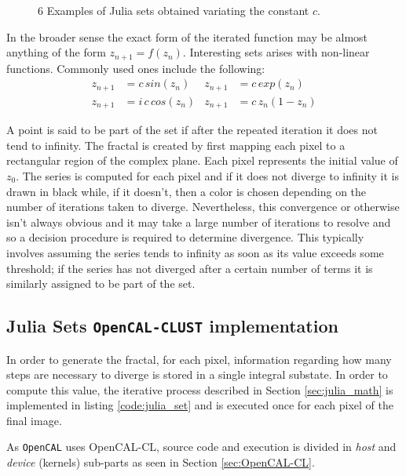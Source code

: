 \begin{figure}[!htb]
    \caption{6 Examples of Julia sets obtained variating the constant $c$.}
        \label{fig:julia_set_c}
\end{figure}

In the broader sense the exact form of the iterated function may be almost anything of the form $z_{n+1} = f(z_n)$. Interesting sets arises with non-linear functions. Commonly used ones include the following:
\begin{align*}
z_{n+1} &= c\, sin(z_n) & z_{n+1} &= c \,exp(z_n)\\
z_{n+1} &= i\,c\, cos(z_n) &z_{n+1} &= c\, z_n(1-z_n)
\end{align*}

A point is said to be part of the set if after the repeated iteration it does not tend to infinity.
The fractal is created by first mapping each pixel to a rectangular region of the complex plane. Each pixel represents the initial value of $z_0$. The series is computed for each pixel and if it does not diverge to infinity it is drawn in black while, if it doesn't, then a color is chosen depending on the number of iterations taken to diverge. Nevertheless, this convergence or otherwise isn't always obvious and it may take a large number of iterations to resolve and so a decision procedure is required to determine divergence. This typically involves assuming the series tends to infinity as soon as its value exceeds some threshold; if the series has not diverged after a certain number of terms it is similarly assigned to be part of the set. 

\subsection{Julia Sets \texttt{OpenCAL-CLUST}  implementation}
In order to generate the fractal, for each pixel, information regarding how many steps are necessary to diverge is stored in a single integral substate.
In order to compute this value, the iterative process described in Section \ref{sec:julia_math} is implemented in listing \ref{code:julia_set} and is executed once for each pixel of the final image.

As \texttt{OpenCAL} uses OpenCAL-CL, source code and execution is divided in \textit{host} and \textit{device} (kernels) sub-parts as seen in Section \ref{sec:OpenCAL-CL}.  

